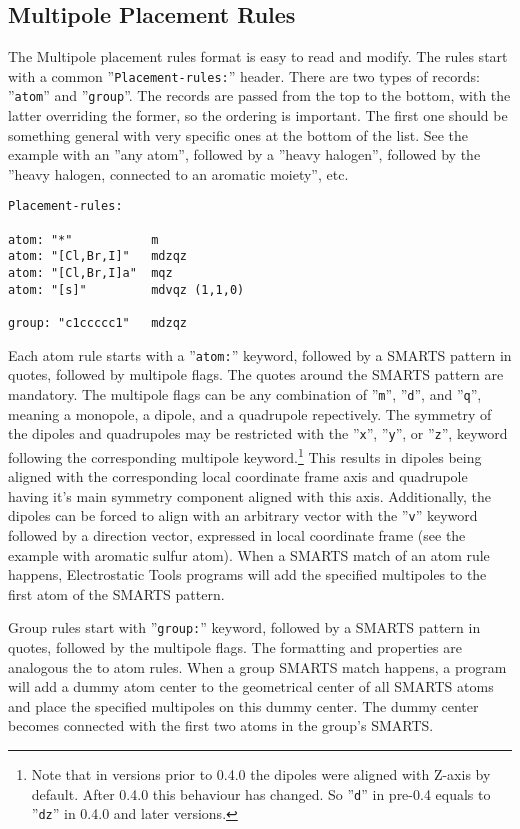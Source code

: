 \documentclass[10pt,a4paper]{article}
\begin{document}
\subsection{Multipole Placement Rules}
The Multipole placement rules format is easy to read and modify. The rules start with a common 
''\lstinline{Placement-rules:}'' header. There are two types of records: 
''\lstinline{atom}'' and ''\lstinline{group}''.
The records are passed from the top to the bottom, with the latter overriding the former, so
the ordering is important. The first one should be something general with very specific ones at 
the
bottom of the list. See the example with an ''any atom'', followed by a ''heavy halogen'', 
followed by the ''heavy halogen, connected to an aromatic moiety'', etc. 
\begin{lstlisting}[style=file]
Placement-rules:

atom: "*"           m
atom: "[Cl,Br,I]"   mdzqz
atom: "[Cl,Br,I]a"  mqz
atom: "[s]"         mdvqz (1,1,0)

group: "c1ccccc1"   mdzqz
\end{lstlisting}
Each atom rule starts with a ''\lstinline{atom:}'' keyword, followed by a SMARTS pattern 
in quotes, followed by multipole flags. The quotes around the SMARTS pattern are mandatory.
The multipole flags can be any combination of ''\lstinline{m}'', ''\lstinline{d}'', and
''\lstinline{q}'', meaning a monopole, a dipole, and a quadrupole repectively.
The symmetry of the dipoles and quadrupoles may be restricted with the ''\lstinline{x}'', 
''\lstinline{y}'', or ''\lstinline{z}'', keyword following the corresponding multipole 
keyword.\footnote{Note that in versions prior to 0.4.0 the dipoles were aligned with 
Z-axis by default. After 0.4.0 this behaviour has changed. So ''\lstinline{d}'' in 
pre-0.4 equals to ''\lstinline{dz}'' in 0.4.0 and later versions. } 
This results in dipoles being aligned with the corresponding local coordinate 
frame axis and quadrupole having it's main symmetry component aligned with this axis. 
Additionally, the dipoles can be forced to align with an arbitrary vector with the 
''\lstinline{v}'' keyword followed by a direction vector, expressed in local coordinate 
frame (see the example with aromatic sulfur atom).
When a SMARTS match of an atom rule happens, Electrostatic Tools programs will 
add the specified multipoles to the first atom of the SMARTS pattern. 

Group rules start with ''\lstinline{group:}'' keyword, followed by a SMARTS pattern 
in quotes, followed by the multipole flags. The formatting and properties are analogous the 
to atom rules. When a group SMARTS match happens, a program will add a dummy atom center 
to the geometrical
center of all SMARTS atoms and place the specified multipoles on this dummy
center. The dummy center becomes connected with the first two atoms in the group's SMARTS.
\end{document}
